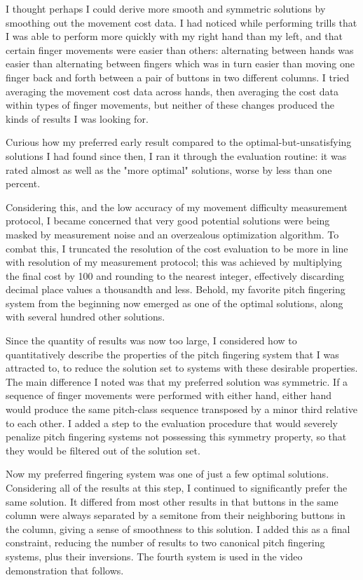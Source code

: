 \documentclass[sigconf]{nimeart}
\begin{document}
I thought perhaps I could derive more smooth and symmetric solutions by smoothing out the movement cost data. I had noticed while performing trills that I was able to perform more quickly with my right hand than my left, and that certain finger movements were easier than others: alternating between hands was easier than alternating between fingers which was in turn easier than moving one finger back and forth between a pair of buttons in two different columns. I tried averaging the movement cost data across hands, then averaging the cost data within types of finger movements, but neither of these changes produced the kinds of results I was looking for.

Curious how my preferred early result compared to the optimal-but-unsatisfying solutions I had found since then, I ran it through the evaluation routine: it was rated almost as well as the "more optimal" solutions, worse by less than one percent.

Considering this, and the low accuracy of my movement difficulty measurement protocol, I became concerned that very good potential solutions were being masked by measurement noise and an overzealous optimization algorithm. To combat this, I truncated the resolution of the cost evaluation to be more in line with resolution of my measurement protocol; this was achieved by multiplying the final cost by 100 and rounding to the nearest integer, effectively discarding decimal place values a thousandth and less. Behold, my favorite pitch fingering system from the beginning now emerged as one of the optimal solutions, along with several hundred other solutions.

Since the quantity of results was now too large, I considered how to quantitatively describe the properties of the pitch fingering system that I was attracted to, to reduce the solution set to systems with these desirable properties. The main difference I noted was that my preferred solution was symmetric. If a sequence of finger movements were performed with either hand, either hand would produce the same pitch-class sequence transposed by a minor third relative to each other. I added a step to the evaluation procedure that would severely penalize pitch fingering systems not possessing this symmetry property, so that they would be filtered out of the solution set.

Now my preferred fingering system was one of just a few optimal solutions. Considering all of the results at this step, I continued to significantly prefer the same solution. It differed from most other results in that buttons in the same column were always separated by a semitone from their neighboring buttons in the column, giving a sense of smoothness to this solution. I added this as a final constraint, reducing the number of results to two canonical pitch fingering systems, plus their inversions. The fourth system is used in the video demonstration that follows.
\end{document}
